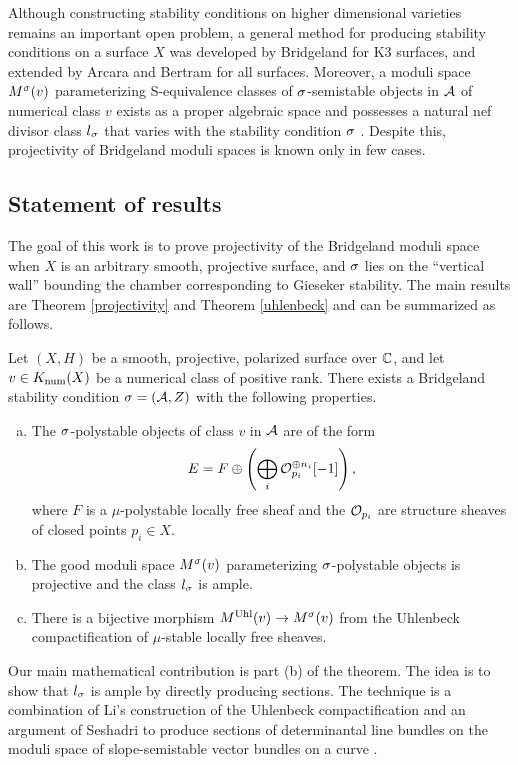 Although constructing stability conditions on higher dimensional varieties remains an important open problem, a general method for producing stability conditions on a surface $X$ was developed by Bridgeland \cite{bridgelandK3} for K3 surfaces, and extended by Arcara and Bertram \cite{ABL13} for all surfaces. Moreover, a moduli space $M^\sigma(v)$ parameterizing S-equivalence classes of $\sigma$-semistable objects in $\mathcal{A}$ of numerical class $v$ exists as a proper algebraic space \cite[Theorem 7.25, Example 7.27]{AHLH} and possesses a natural nef divisor class $l_\sigma$ that varies with the stability condition $\sigma$ \cite{BM}. Despite this, projectivity of Bridgeland moduli spaces is known only in few cases.

\subsection*{Statement of results}

The goal of this work is to prove projectivity of the Bridgeland moduli space when $X$ is an arbitrary smooth, projective surface, and $\sigma$ lies on the ``vertical wall'' bounding the chamber corresponding to Gieseker stability. The main results are Theorem \ref{projectivity} and Theorem \ref{uhlenbeck} and can be summarized as follows.
\begin{thm}
    Let $(X,H)$ be a smooth, projective, polarized surface over $\mathbb{C}$, and let $v \in K_{\mathrm{num}}(X)$ be a numerical class of positive rank. There exists a Bridgeland stability condition $\sigma = (\mathcal{A}, Z)$ with the following properties.
    \begin{enumerate}[(a)]
        \item The $\sigma$-polystable objects of class $v$ in $\mathcal{A}$ are of the form
        \[ E = F \oplus \left(\bigoplus_i \mathcal{O}_{p_i}^{\oplus n_i} [-1]\right), \]
        where $F$ is a $\mu$-polystable locally free sheaf and the $\mathcal{O}_{p_i}$ are structure sheaves of closed points $p_i \in X$.
        \item The good moduli space $M^\sigma(v)$ parameterizing $\sigma$-polystable objects is projective and the class $l_\sigma$ is ample.
        \item There is a bijective morphism $M^{\mathrm{Uhl}}(v) \to M^\sigma(v)$ from the Uhlenbeck compactification of $\mu$-stable locally free sheaves.
    \end{enumerate}
\end{thm}
Our main mathematical contribution is part (b) of the theorem. The idea is to show that $l_\sigma$ is ample by directly producing sections. The technique is a combination of Li's construction of the Uhlenbeck compactification and an argument of Seshadri to produce sections of determinantal line bundles on the moduli space of slope-semistable vector bundles on a curve \cite{seshadri}.

